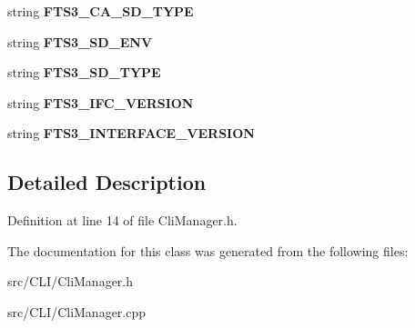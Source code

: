 \begin{DoxyCompactItemize}
\item 
string {\bfseries FTS3\_\-CA\_\-SD\_\-TYPE}\label{classCliManager_a34048663a89b917fa76f20bc2e283923}

\item 
string {\bfseries FTS3\_\-SD\_\-ENV}\label{classCliManager_a787d355931904bcedba4f0345ac1ec27}

\item 
string {\bfseries FTS3\_\-SD\_\-TYPE}\label{classCliManager_ade03c3d47c10811aaaa6e0368392fa80}

\item 
string {\bfseries FTS3\_\-IFC\_\-VERSION}\label{classCliManager_a83f99d6ccb12638730d9ee3d18e1edee}

\item 
string {\bfseries FTS3\_\-INTERFACE\_\-VERSION}\label{classCliManager_a10f9907c34a192bc8cc796de2d2d8591}

\end{DoxyCompactItemize}


\subsection{Detailed Description}


Definition at line 14 of file CliManager.h.



The documentation for this class was generated from the following files:\begin{DoxyCompactItemize}
\item 
src/CLI/CliManager.h\item 
src/CLI/CliManager.cpp\end{DoxyCompactItemize}
